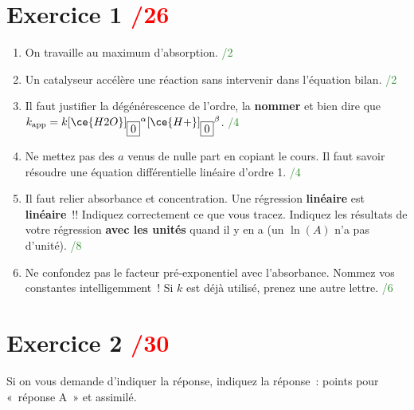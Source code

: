 \documentclass[a4paper, 10pt, final, garamond]{book}
\begin{document}
\section{Exercice 1 \hfill \textcolor{red}{/26}}

\begin{enumerate}
    \item On travaille au maximum d'absorption. \hfill
        \textcolor{ForestGreen}{/2}
    \item Un catalyseur accélère une réaction sans intervenir dans l'équation
        bilan. \hfill \textcolor{ForestGreen}{/2}
    \item Il faut justifier la dégénérescence de l'ordre, la \textbf{nommer} et
        bien dire que $k_{\rm app} =
        k[\ce{H2O}]_{\fbox{0}}{}^{\alpha}[\ce{H+}]_{\fbox{0}}{}^{\beta}$. \hfill
        \textcolor{ForestGreen}{/4}
    \item Ne mettez pas des $a$ venus de nulle part en copiant le cours. Il faut
        savoir résoudre une équation différentielle linéaire d'ordre 1. \hfill
        \textcolor{ForestGreen}{/4}
    \item Il faut relier absorbance et concentration. Une régression
        \textbf{linéaire} est \textbf{linéaire}~!! Indiquez correctement ce que
        vous tracez. Indiquez les résultats de votre régression \textbf{avec les
        unités} quand il y en a (un $\ln(A)$ n'a pas d'unité). \hfill
        \textcolor{ForestGreen}{/8}
    \item Ne confondez pas le facteur pré-exponentiel avec l'absorbance. Nommez
        vos constantes intelligemment~! Si $k$ est déjà utilisé, prenez une
        autre lettre. \hfill \textcolor{ForestGreen}{/6}
\end{enumerate}

\section{Exercice 2 \hfill \textcolor{red}{/30}}

\begin{framed}
    \centering\large
    Si on vous demande d'indiquer la réponse, indiquez la réponse~: points pour
    «~réponse A~» et assimilé.
\end{framed}
\end{document}
